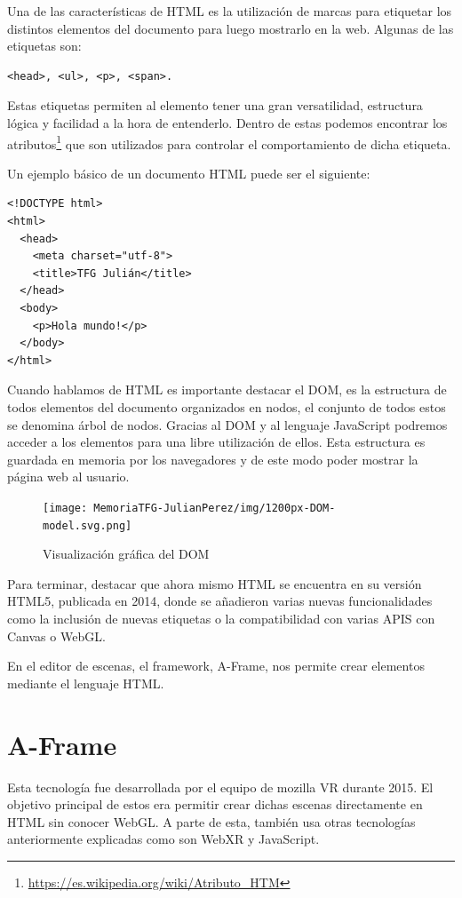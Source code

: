 \documentclass[a4paper, 12pt]{book}
\begin{document}
Una de las características de HTML es la utilización de marcas para etiquetar los distintos elementos del documento para luego mostrarlo en la web. Algunas de las etiquetas son: \begin{verbatim}<head>, <ul>, <p>, <span>.\end{verbatim} 

Estas etiquetas permiten al elemento tener una gran versatilidad, estructura lógica y facilidad a la hora de entenderlo. Dentro de estas podemos encontrar los atributos\footnote{\url{https://es.wikipedia.org/wiki/Atributo_HTM}} que son utilizados para controlar el comportamiento de dicha etiqueta.

Un ejemplo básico de un documento HTML puede ser el siguiente:

\begin{verbatim}
<!DOCTYPE html>
<html>
  <head>
    <meta charset="utf-8">
    <title>TFG Julián</title>
  </head>
  <body>
    <p>Hola mundo!</p>
  </body>
</html>
\end{verbatim}

Cuando hablamos de HTML es importante destacar el DOM, es la estructura de todos elementos del documento organizados en nodos, el conjunto de todos estos se denomina árbol de nodos. Gracias al DOM y al lenguaje JavaScript podremos acceder a los elementos para una libre utilización de ellos. Esta estructura es guardada en memoria por los navegadores y de este modo poder mostrar la página web al usuario.


\begin{figure}[H]
  \centering
  \texttt{[image: MemoriaTFG-JulianPerez/img/1200px-DOM-model.svg.png]}
  \caption{Visualización gráfica del DOM}\label{html}
\end{figure}

Para terminar, destacar que ahora mismo HTML se encuentra en su versión HTML5, publicada en 2014, donde se añadieron varias nuevas funcionalidades como la inclusión de nuevas etiquetas o la compatibilidad con varias APIS con Canvas o WebGL.

En el editor de escenas, el framework, A-Frame, nos permite crear elementos mediante el lenguaje HTML.

\section{A-Frame} %
\label{sec:A-Frame}

Esta tecnología fue desarrollada por el equipo de mozilla VR durante 2015. El objetivo principal de estos era permitir crear dichas escenas directamente en HTML sin conocer WebGL. A parte de esta, también usa otras tecnologías anteriormente explicadas como son WebXR y JavaScript.
\end{document}
